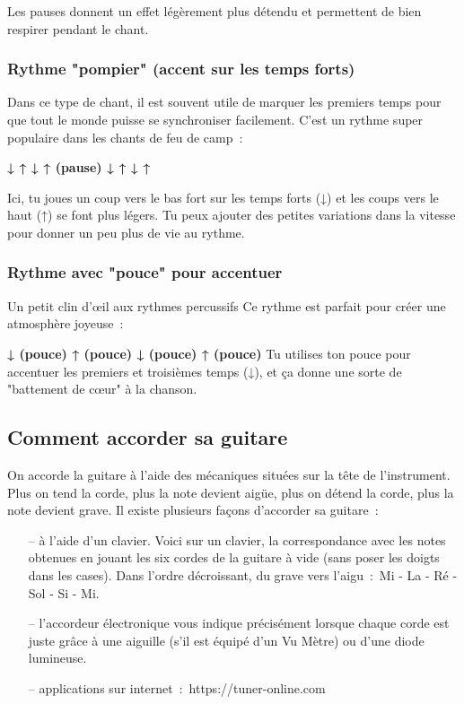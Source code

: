 Les pauses donnent un effet légèrement plus détendu et permettent de bien respirer pendant le chant.

\subsubsection*{Rythme "pompier" (accent sur les temps forts)}

Dans ce type de chant, il est souvent utile de marquer les premiers temps pour que tout le monde puisse se synchroniser facilement. C'est un rythme super populaire dans les chants de feu de camp~:~

\textbf{↓ ↑ ↓ ↑ (pause) ↓ ↑ ↓ ↑}

Ici, tu joues un coup vers le bas fort sur les temps forts (↓) et les coups vers le haut (↑) se font plus légers. Tu peux ajouter des petites variations dans la vitesse pour donner un peu plus de vie au rythme.

\subsubsection*{Rythme avec "pouce" pour accentuer}

Un petit clin d'œil aux rythmes percussifs \! Ce rythme est parfait pour créer une atmosphère joyeuse~:~

\textbf{↓ (pouce) ↑ (pouce) ↓ (pouce) ↑ (pouce)}
Tu utilises ton pouce pour accentuer les premiers et troisièmes temps (↓), et ça donne une sorte de "battement de cœur" à la chanson.

\subsection{Comment accorder sa guitare}
On accorde la guitare à l'aide des mécaniques situées sur la tête de l'instrument. Plus on tend la corde, plus la note devient aigüe, plus on détend la corde, plus la note devient grave.
Il existe plusieurs façons d'accorder sa guitare~:~

\begin{itemize}
    \item[--] à l'aide d'un clavier. Voici sur un clavier, la correspondance avec les notes obtenues en jouant les six cordes de la guitare \guillemetleft à vide \guillemetright (sans poser les doigts dans les cases). Dans l'ordre décroissant, du grave vers l'aigu~:~Mi - La - Ré - Sol - Si - Mi.
    \item[--] l'accordeur électronique vous indique précisément lorsque chaque corde est juste grâce à une aiguille (s'il est équipé d'un Vu Mètre) ou d'une diode lumineuse.
    \item[--] applications sur internet~:~https://tuner-online.com
\end{itemize}

